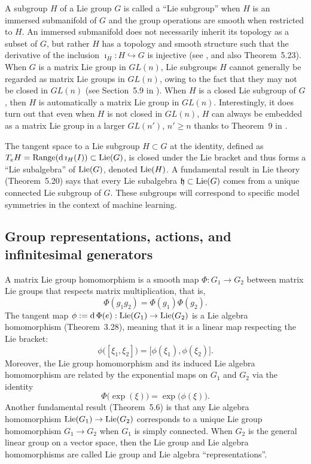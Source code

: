 \documentclass[twoside,11pt]{article}
\begin{document}
A subgroup $H$ of a Lie group $G$ is called a ``Lie subgroup'' when $H$ is an immersed submanifold of $G$ and the group operations are smooth when restricted to $H$.
An immersed submanifold does not necessarily inherit its topology as a subset of $G$, but rather $H$ has a topology and smooth structure such that the derivative of the inclusion $\imath_H : H \hookrightarrow G$ is injective (see \cite{Lee2013introduction}, and also Theorem~5.23).
When $G$ is a matrix Lie group in $GL(n)$, Lie subgroups $H$ cannot generally be regarded as matrix Lie groups in $GL(n)$, owing to the fact that they may not be closed in $GL(n)$ (see Section~5.9 in \cite{Hall2015Lie}).
When $H$ is a closed Lie subgroup of $G$, then $H$ is automatically a matrix Lie group in $GL(n)$.
Interestingly, it does turn out that even when $H$ is not closed in $GL(n)$, $H$ can always be embedded as a matrix Lie group in a larger $GL(n')$, $n' \geq n$ thanks to Theorem~9 in \cite{Goto1950faithful}.

The tangent space to a Lie subgroup $H \subset G$ at the identity, defined as $T_e H = \operatorname{Range}(\operatorname{\mathrm{d}} \imath_H(I)) \subset \operatorname{Lie}(G)$, is closed under the Lie bracket and thus forms a ``Lie subalgebra'' of $\operatorname{Lie}(G)$, denoted $\operatorname{Lie}(H)$.
A fundamental result in Lie theory (Theorem~5.20) says that every Lie subalgebra ${\mathfrak{h}} \subset \operatorname{Lie}(G)$ comes from a unique connected Lie subgroup of $G$. 
These subgroups will correspond to specific model symmetries in the context of machine learning. 

\subsection{Group representations, actions, and infinitesimal generators}

A matrix Lie group homomorphism is a smooth map $\Phi:G_1 \to G_2$ between matrix Lie groups that respects matrix multiplication, that is,
\begin{equation}
    \Phi(g_1 g_2) = \Phi(g_1) \Phi(g_2).
\end{equation}
The tangent map $\phi := \operatorname{\mathrm{d}} \Phi(e): \operatorname{Lie}(G_1) \to \operatorname{Lie}(G_2)$ is a Lie algebra homomorphism (Theorem~3.28), meaning that it is a linear map respecting the Lie bracket:
\begin{equation}
    \phi\big( [\xi_1, \xi_2] \big) = \big[\phi(\xi_1), \phi(\xi_2)\big].
\end{equation}
Moreover, the Lie group homomorphism and its induced Lie algebra homomorphism are related by the exponential maps on $G_1$ and $G_2$ via the identity
\begin{equation}
    \Phi\big( \exp(\xi) \big) = \exp\big( \phi(\xi) \big).
    \label{eqn:intertwining_exp_and_rep}
\end{equation}
Another fundamental result (Theorem~5.6) is that any Lie algebra homomorphism $\operatorname{Lie}(G_1) \to \operatorname{Lie}(G_2)$ corresponds to a unique Lie group homomorphism $G_1 \to G_2$ when $G_1$ is simply connected.
When $G_2$ is the general linear group on a vector space, then the Lie group and Lie algebra homomorphisms are called Lie group and Lie algebra ``representations''.
\end{document}
